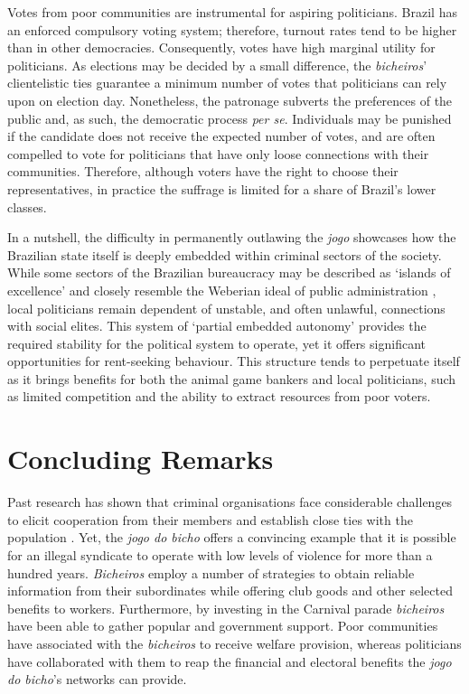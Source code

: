 \documentclass[a4paper,12pt]{article}
\begin{document}
Votes from poor communities are instrumental for aspiring politicians. Brazil has an enforced compulsory voting system; therefore, turnout rates tend to be higher than in other democracies. Consequently, votes have high marginal utility for politicians. As elections may be decided by a small difference, the \emph{bicheiros}' clientelistic ties guarantee a minimum number of votes that politicians can rely upon on election day. Nonetheless, the patronage subverts the preferences of the public and, as such, the democratic process \textit{per se}. Individuals may be punished if the candidate does not receive the expected number of votes, and are often compelled to vote for politicians that have only loose connections with their communities. Therefore, although voters have the right to choose their representatives, in practice the suffrage is limited for a share of Brazil's lower classes.

In a nutshell, the difficulty in permanently outlawing the \textit{jogo} showcases how the Brazilian state itself is deeply embedded within criminal sectors of the society. While some sectors of the Brazilian bureaucracy may be described as `islands of excellence' and closely resemble the Weberian ideal of public administration \citep{bersch2017state}, local politicians remain dependent of unstable, and often unlawful, connections with social elites. This system of `partial embedded autonomy' \citep{evans1995embedded} provides the required stability for the political system to operate, yet it offers significant opportunities for rent-seeking behaviour. This structure tends to perpetuate itself as it brings benefits for both the animal game bankers and local politicians, such as limited competition and the ability to extract resources from poor voters.   

\section{Concluding Remarks}
\label{sec:conclusion3}

Past research has shown that criminal organisations face considerable challenges to elicit cooperation from their members and establish close ties with the population \citep[e.g.][]{gambetta1996sicilian,skarbek2011governance,skarbek2012prison,varese2001russian,varese2011mafias}. Yet, the \textit{jogo do bicho} offers a convincing example that it is possible for an illegal syndicate to operate with low levels of violence for more than a hundred years. \textit{Bicheiros} employ a number of strategies to obtain reliable information from their subordinates while offering club goods and other selected benefits to workers. Furthermore, by investing in the Carnival parade \textit{bicheiros} have been able to gather popular and government support. Poor communities have associated with the \textit{bicheiros} to receive welfare provision, whereas politicians have collaborated with them to reap the financial and electoral benefits the \textit{jogo do bicho}'s networks can provide.
\end{document}
